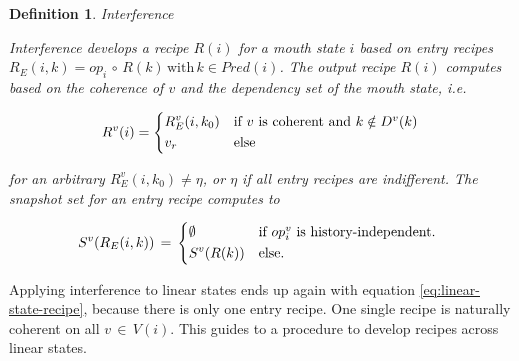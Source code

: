 \documentclass[12pt,a4paper]{scrartcl}
\newtheorem{definition}{Definition}
\begin{document}
\begin{definition} Interference

    Interference develops a recipe $R(i)$ for a mouth state $i$ based on entry
    recipes $R_E(i,k) = op_i\,\circ\,R(k)\,\mbox{with}\,k \in Pred(i)$.  The
    output recipe $R(i)$ computes based on the coherence of $v$ and the
    dependency set of the mouth state, i.e.

    \begin{equation} \label{eq:interference-output}
        R^v(i) = 
        \begin{dcases*}
            R_E^v(i,k_0) & if $v$ is coherent and $k\notin D^v(k)$\\
            v_r         & else
        \end{dcases*}
    \end{equation}

    for an arbitrary $R_E^v(i,k_0)\neq\eta$, or $\eta$ if all entry recipes are
    indifferent. The snapshot set for an entry recipe computes to

    \begin{equation} \label{eq:composition-aux}
        S^v(R_E(i,k))\,=\,\begin{dcases*}
                           \emptyset & if $op^v_i$ is history-independent. \\
                           S^v(R(k)) & else.\\
                          \end{dcases*}
    \end{equation}
\end{definition}

Applying interference to linear states ends up again with equation
\eqref{eq:linear-state-recipe}, because there is only one entry recipe.  One
single recipe is naturally coherent on all $v\,\in\,V(i)$. This guides to a
procedure to develop recipes across linear states.
\end{document}
